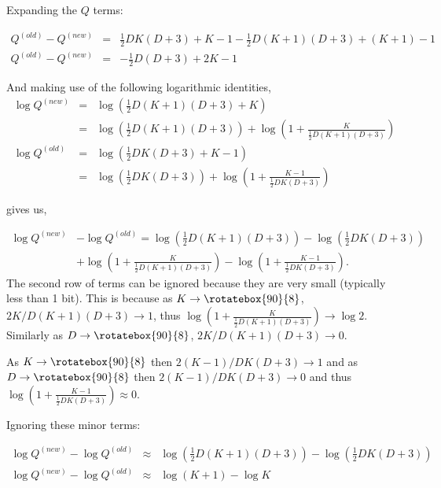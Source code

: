 \documentclass{elsarticle}
\def\infinity{\rotatebox{90}{8}}
\begin{document}
Expanding the $Q$ terms:

\begin{eqnarray}
Q^{(old)} - Q^{(new)} &=& \frac{1}{2}DK(D + 3) + K - 1 - \frac{1}{2}D(K + 1)(D + 3) + (K + 1) - 1 \nonumber \\
Q^{(old)} - Q^{(new)} &=& -\frac{1}{2}D(D+3) + 2K  - 1
\label{eq:14}
\end{eqnarray}

\noindent{}And making use of the following logarithmic identities,
\begin{eqnarray}
  \log{Q^{(new)}} &=& \log{\left(\frac{1}{2}D(K+1)(D + 3) + K\right)} \nonumber \\
                  &=& \log{\left(\frac{1}{2}D(K+1)(D + 3)\right)} + \log{\left(1 + \frac{K}{\frac{1}{2}D(K+1)(D + 3)}\right)} \\
  \log{Q^{(old)}} &=& \log{\left(\frac{1}{2}DK(D + 3) + K - 1\right)} \nonumber \\
                  &=& \log{\left(\frac{1}{2}DK(D + 3)\right)} + \log{\left(1 + \frac{K - 1}{\frac{1}{2}DK(D + 3)}\right)}
\end{eqnarray}


\noindent{}gives us,

\begin{eqnarray}
  \log{Q^{(new)}} &- \log{Q^{(old)}} = \log{\left(\frac{1}{2}D(K+1)(D + 3)\right)} - \log{\left(\frac{1}{2}DK(D + 3)\right)} \nonumber \\
                                    &+ \log{\left(1 + \frac{K}{\frac{1}{2}D(K+1)(D + 3)}\right)} - \log{\left(1 + \frac{K - 1}{\frac{1}{2}DK(D + 3)}\right)}.
\end{eqnarray}
The second row of terms can be ignored because they are very small (typically less than 1 bit). This is because as $K \rightarrow \infinity$, $2K/D(K+1)(D+3) \rightarrow 1$, thus $\log{\left(1 + \frac{K}{\frac{1}{2}D(K+1)(D + 3)}\right)} \rightarrow \log{2}$. Similarly as $D \rightarrow \infinity$, $2K/D(K+1)(D+3) \rightarrow 0$.

As $K \rightarrow \infinity$ then $2(K-1)/DK(D+3) \rightarrow 1$ and as $D \rightarrow \infinity$ then $2(K-1)/DK(D+3) \rightarrow 0$ and thus $\log{\left(1 + \frac{K - 1}{\frac{1}{2}DK(D + 3)}\right)} \approx 0$.

\noindent{}Ignoring these minor terms:

\begin{eqnarray}
  \log{Q^{(new)}} - \log{Q^{(old)}} &\approx& \log{\left(\frac{1}{2}D(K+1)(D + 3)\right)} - \log{\left(\frac{1}{2}DK(D + 3)\right)} \nonumber \\
  \log{Q^{(new)}} - \log{Q^{(old)}} &\approx& \log{(K + 1)} - \log{K}
  \label{eq:19}
\end{eqnarray}
\end{document}
